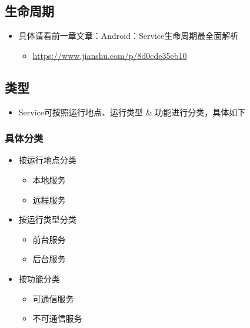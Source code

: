 \documentclass[9pt, b5paper]{article}
\begin{document}
\subsection{生命周期}
\label{sec-2-4}
\begin{itemize}
\item 具体请看前一章文章：Android：Service生命周期最全面解析
\begin{itemize}
\item \url{https://www.jianshu.com/p/8d0cde35eb10}
\end{itemize}
\end{itemize}
\subsection{类型}
\label{sec-2-5}
\begin{itemize}
\item Service可按照运行地点、运行类型 \& 功能进行分类，具体如下
\end{itemize}
\subsubsection{具体分类}
\label{sec-2-5-1}
\begin{itemize}
\item 按运行地点分类
\begin{itemize}
\item 本地服务
\item 远程服务
\end{itemize}
\item 按运行类型分类
\begin{itemize}
\item 前台服务
\item 后台服务
\end{itemize}
\item 按功能分类
\begin{itemize}
\item 可通信服务
\item 不可通信服务
\end{itemize}
\end{itemize}
\end{document}
